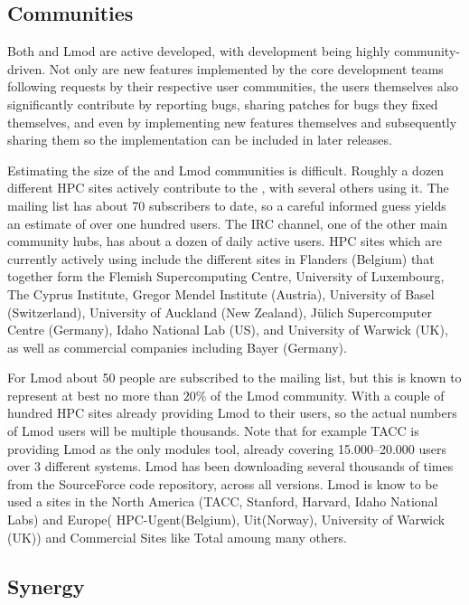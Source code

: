 \subsection{Communities}
\label{sec:communities}

Both \easybuild{} and Lmod are active developed, with development being
highly community-driven. Not only are new features implemented by the core
development teams following requests by their respective user communities, the
users themselves also significantly contribute by reporting bugs, sharing patches
for bugs they fixed themselves, and even by implementing new features themselves
and subsequently sharing them so the implementation can be included in later
releases.

Estimating the size of the \easybuild{} and Lmod communities is difficult.
Roughly a dozen different HPC sites actively contribute to the \easybuild{}, with
several others using it. The \easybuild{} mailing list has about 70 subscribers
to date, so a careful informed guess yields an estimate of over one hundred
users. The \easybuild{} IRC channel, one of the other main community hubs, has
about a dozen of daily active users. HPC sites which are currently actively using
\easybuild{} include the different sites in Flanders (Belgium) that together form
the Flemish Supercomputing Centre, University of Luxembourg, The Cyprus Institute,
Gregor Mendel Institute (Austria), University of Basel (Switzerland), University
of Auckland (New Zealand), J\"ulich Supercomputer Centre (Germany), Idaho
National Lab (US), and University of Warwick (UK), as well as commercial
companies including Bayer (Germany).

For Lmod about 50 people are subscribed to the mailing list, but this
is known to represent at best no more than $20\%$ of the Lmod community. With a
couple of hundred HPC sites already providing Lmod to their users, so the actual
numbers of Lmod users will be multiple thousands. Note that for example TACC is
providing Lmod as the only modules tool, already covering 15.000--20.000 users
over 3 different systems. Lmod has been downloading several thousands of times
from the SourceForce code repository, across all versions.
Lmod is know to be used a sites in the North America (TACC, Stanford, Harvard,
Idaho National Labs) and Europe( HPC-Ugent(Belgium), Uit(Norway),
University of Warwick (UK)) and Commercial Sites like Total amoung
many others.

\subsection{Synergy}

